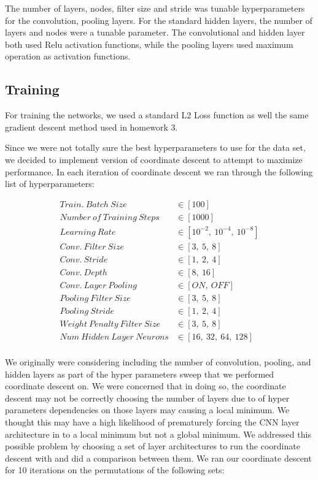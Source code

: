 \documentclass[journal]{IEEEtran}
\begin{document}
The number of layers, nodes, filter size and stride was tunable hyperparameters for the convolution, pooling layers. For the standard hidden layers, the number of layers and nodes were a tunable parameter. The convolutional and hidden layer both used Relu activation functions, while the pooling layers used maximum operation as activation functions. 



\subsection{Training}
For training the networks, we used a standard L2 Loss function as well the same gradient descent method used in homework 3. 

Since we were not totally sure the best hyperparameters to use for the data set, we decided to implement version of coordinate descent to attempt to maximize performance. 
In each iteration of coordinate descent we ran through the following list of hyperparameters:


\begin{align*}
Train.\ Batch\ Size  &\in [100]\\
Number\ of\ Training\ Steps  &\in [1000]\\
Learning\ Rate &\in [10^{-2},\ 10^{-4},\ 10^{-8}]\\
Conv.\ Filter\ Size &\in [3,\ 5,\ 8]\\
Conv.\ Stride &\in [1,\ 2,\ 4]\\
Conv.\ Depth &\in [8,\ 16]\\
Conv.\ Layer\ Pooling\  &\in [ON,\ OFF]\\
Pooling\ Filter\ Size &\in [3,\ 5,\ 8]\\
Pooling\ Stride &\in [1,\ 2,\ 4]\\
Weight\ Penalty\ Filter\ Size &\in [3,\ 5,\ 8]\\
Num\ Hidden\ Layer\ Neurons &\in [16,\ 32,\ 64,\ 128]\\
\end{align*}

We originally were considering including the number of convolution, pooling, and hidden layers as part of the hyper parameters sweep that we performed coordinate descent on. We were concerned that in doing so, the coordinate descent may not be correctly choosing the number of layers due to  of hyper parameters dependencies on those layers may causing a local minimum. We thought this may have a high likelihood of prematurely forcing the CNN layer architecture in to a local minimum but not a global minimum. We addressed this possible problem by choosing a set of layer architectures to run the coordinate descent with and did a comparison between them. We ran our coordinate descent for 10 iterations on the permutations of the following sets:
\end{document}
